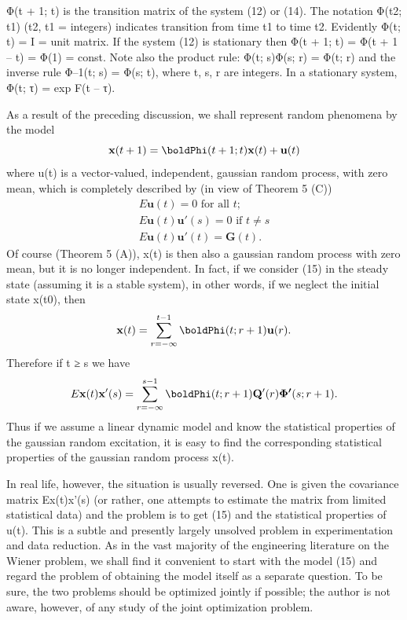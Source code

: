 \documentclass{article}
\begin{document}
Φ(t + 1; t) is the transition matrix of the system (12) or (14).
The notation Φ(t2; t1) (t2, t1 = integers) indicates transition from
time t1 to time t2. Evidently Φ(t; t) = I = unit matrix. If the system
(12) is stationary then Φ(t + 1; t) = Φ(t + 1 – t) = Φ(1) = const.
Note also the product rule: Φ(t; s)Φ(s; r) = Φ(t; r) and the inverse
rule Φ–1(t; s) = Φ(s; t), where t, s, r are integers. In a stationary
system, Φ(t; τ) = exp F(t – τ).

As a result of the preceding discussion, we shall represent random
phenomena by the model
\begin{equation}
\label{eq15}
\mathbf{x}(t+1)=\boldPhi(t+1;t)\mathbf{x}(t)+\mathbf{u}(t)
\end{equation}
where {u(t)} is a vector-valued, independent, gaussian random
process, with zero mean, which is completely described by (in
view of Theorem 5 (C))
\begin{align*}
E\mathbf{u}(t)=0 \text{ for all } t;\\
E\mathbf{u}(t)\mathbf{u'}(s)=0 \text{ if } t \ne s\\
E\mathbf{u}(t)\mathbf{u'}(t)=\mathbf{G}(t).
\end{align*}
Of course (Theorem 5 (A)), x(t) is then also a gaussian random
process with zero mean, but it is no longer independent. In fact, if
we consider (15) in the steady state (assuming it is a stable system),
in other words, if we neglect the initial state x(t0), then
\begin{equation*}
\mathbf{x}(t)=\sum^{t-1}_{r=-\infty}\boldPhi(t;r+1)\mathbf{u}(r).
\end{equation*}
Therefore if t ≥ s we have
\begin{equation*}
E\mathbf{x}(t)\mathbf{x'}(s)=\sum^{s-1}_{r=-\infty}\boldPhi(t;r+1)\mathbf{Q'}(r)\boldsymbol{\Phi'}(s;r+1).
\end{equation*}
Thus if we assume a linear dynamic model and know the
statistical properties of the gaussian random excitation, it is easy
to find the corresponding statistical properties of the gaussian
random process {x(t)}.

In real life, however, the situation is usually reversed. One is
given the covariance matrix Ex(t)x'(s) (or rather, one attempts to
estimate the matrix from limited statistical data) and the problem
is to get (15) and the statistical properties of u(t). This is a subtle
and presently largely unsolved problem in experimentation and
data reduction. As in the vast majority of the engineering
literature on the Wiener problem, we shall find it convenient to
start with the model (15) and regard the problem of obtaining the
model itself as a separate question. To be sure, the two problems
should be optimized jointly if possible; the author is not aware,
however, of any study of the joint optimization problem.
\end{document}
